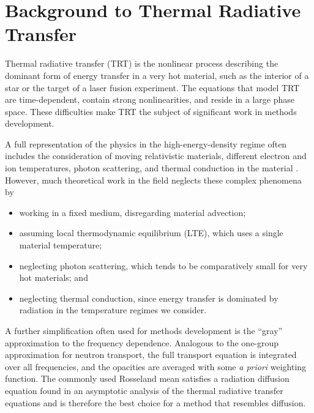 
\chapter{Background to Thermal Radiative Transfer}\label{chap:trtBackground}

Thermal radiative transfer (TRT) is the nonlinear process describing the
dominant form of energy transfer in a very hot material, such as the interior
of a star or the
target of a laser fusion experiment. The equations that model TRT are
time-dependent, contain strong nonlinearities, and reside in a large phase
space. These difficulties make TRT the subject of significant work in methods
development.

A full representation of the physics in
the high-energy-density regime often includes the consideration of moving
relativistic materials, different electron and ion temperatures, photon
scattering, and thermal conduction in the material \cite{Mih1984}. However,
much theoretical work in the field neglects these complex phenomena by
\begin{itemize}
  \item working in a fixed medium, disregarding material advection;
  \item assuming local thermodynamic equilibrium (LTE), which uses a single
    material temperature;
  \item neglecting photon scattering, which tends to be comparatively small for
    very hot materials; and
  \item neglecting thermal conduction, since energy transfer is dominated by
    radiation in the temperature regimes we consider.
\end{itemize}

A further simplification often used for methods development is the ``gray''
approximation to the frequency dependence. Analogous to the one-group
approximation for neutron transport, the full transport equation is integrated
over all frequencies, and the opacities are averaged with some \emph{a priori}
weighting function. The commonly used Rosseland mean satisfies a radiation
diffusion equation found in an asymptotic analysis of the thermal radiative
transfer equations \cite{Lar1983a} and is therefore the best choice for a
method that resembles diffusion.

